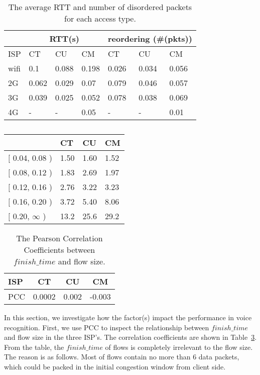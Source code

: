 \begin{table}[th]
\centering
\renewcommand{\arraystretch}{1.2}
\begin{tabular}{l|l|l|l|l|l|l}
	\toprule
	& \multicolumn{3}{c|}{ RTT(s) } & \multicolumn{3}{c}{ reordering (\#(pkts))} \\
	\midrule
	ISP & CT & CU & CM & CT & CU & CM \\
	\midrule
	wifi & 0.1 & 0.088 & 0.198 & 0.026 & 0.034 & 0.056 \\
	\hline
	2G & 0.062 & 0.029 & 0.07 & 0.079 & 0.046 & 0.057 \\
	\hline
	3G & 0.039 & 0.025 & 0.052 & 0.078 & 0.038 & 0.069 \\
	\hline
	4G & - & - & 0.05 & - & - & 0.01 \\
	\bottomrule
\end{tabular}
\caption{The average RTT and number of disordered packets for each access type.}
\label{tab:voice_access_type_stats}
\end{table}


\begin{table}[th]
\centering
\renewcommand{\arraystretch}{1.2}
\begin{tabular}{l|m{.35in}|m{.35in}|m{.35in}}
	\toprule
	& CT & CU & CM \\
	\midrule
	$[$ 0.04, 0.08 ) & 1.50 & 1.60 & 1.52 \\
	\hline
	$[$ 0.08, 0.12 ) & 1.83 & 2.69 & 1.97 \\
	\hline
	$[$ 0.12, 0.16 ) & 2.76 & 3.22 & 3.23 \\
	\hline
	$[$ 0.16, 0.20 ) & 3.72 & 5.40 & 8.06 \\
	\hline
	$[$ 0.20, $\infty$ ) & 13.2 & 25.6 & 29.2 \\
	\bottomrule
\end{tabular}
\caption{}
\label{tab:}
\end{table}

\begin{table}[th]
\centering
\renewcommand{\arraystretch}{1.2}
\begin{tabular}{l|c|c|c}
	\toprule
	ISP & CT & CU & CM \\
	\midrule
	PCC & 0.0002 & 0.002 & -0.003 \\
	\bottomrule
\end{tabular}
\caption{The Pearson Correlation Coefficients between $finish\_time$ and flow size.}
\label{tab:fin_vs_pkt}
\end{table}

In this section, we investigate how the factor(s) impact the performance in voice recognition. First, we use PCC to inspect the relationship between $finish\_time$ and flow size in the three ISP's. The correlation coefficients are shown in Table~\ref{tab:fin_vs_pkt}. From the table, the $finish\_time$ of flows is completely irrelevant to the flow size. The reason is as follows. Most of flows contain no more than 6 data packets, which could be packed in the initial congestion window from client side.

